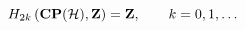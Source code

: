 \begin{equation}
H_{2k}\left({\bf CP}({\cal H}), {\bf Z}\right)={\bf Z}, \qquad k=0,1,\ldots
\label{pelotudo}
\end{equation}


